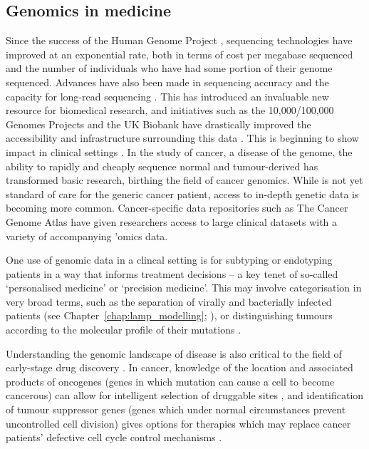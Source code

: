 \documentclass[thesis.tex]{subfiles}
\begin{document}
\subsection{Genomics in medicine}
Since the success of the Human Genome Project \citep{lander_initial_2001}, sequencing technologies
have improved at an exponential rate, both in terms of cost per megabase
sequenced \citep{wetterstrand_dna_2022} and the number of individuals who have had some portion of
their genome sequenced. Advances have also been made in sequencing accuracy and the capacity for long-read sequencing \citep{goldfeder_human_2017}. This has introduced an invaluable new resource
for biomedical research, and initiatives such as the 10,000/100,000 Genomes Projects \citep{telenti_deep_2016} and the UK Biobank \citep{bycroft_uk_2018} have drastically improved the accessibility and infrastructure surrounding this data \citep{szustakowski_advancing_2021}. This is beginning to show impact in clinical settings \citep{prokop_genome_2018}. In the study of cancer, a disease of the
genome, the ability to rapidly and cheaply sequence normal and tumour-derived  has transformed basic research, birthing the field of cancer
genomics. While  is not yet standard of care for the generic cancer patient,
access to in-depth genetic data is becoming more common. Cancer-specific data repositories such as The Cancer Genome Atlas \citep{weinstein_cancer_2013} have given
researchers access to large clinical datasets with a variety of accompanying
'omics data. 

One use of genomic data in a clincal setting is for subtyping or endotyping patients in a way that informs treatment decisions -- a key tenet of so-called `personalised medicine' or `precision medicine'. This may involve categorisation in very broad terms, such as the separation of virally and bacterially infected patients (see Chapter~\ref{chap:lamp_modelling}; \citealp{remmel_diagnostic_2022}), or distinguishing tumours according to the molecular profile of their mutations \citep{zhao_molecular_2019}.

Understanding the genomic landscape of disease is also critical to the field of early-stage drug discovery \citep{nelson_support_2015, raja_integrating_2017, king_are_2019}. In cancer, knowledge of the location and associated products of oncogenes (genes in which mutation can cause a cell to become cancerous) can allow for intelligent selection of druggable sites \citep{weinstein_cancer_2002, bedard_small_2020}, and identification of tumour suppressor genes (genes which under normal circumstances prevent uncontrolled cell division) gives options for therapies which may replace cancer patients' defective cell cycle control mechanisms \citep{fang_tumor-suppressing_2003, morris_therapeutic_2015}. 
\end{document}
